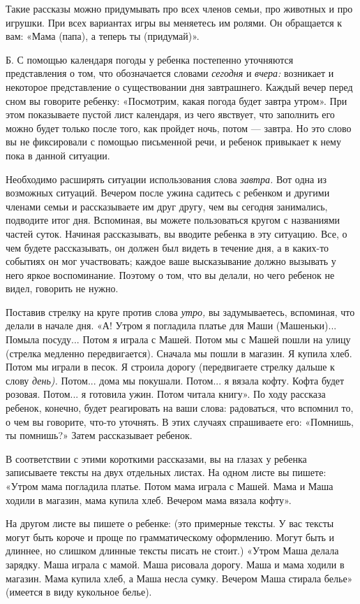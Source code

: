 \documentclass{book}
\renewcommand{\emph}[1]{\textit{#1}}
\begin{document}
Такие рассказы можно придумывать про всех членов семьи, про животных и
про игрушки. При всех вариантах игры вы меняетесь им ролями. Он
обращается к вам: «Мама (папа), а теперь ты (придумай)».

Б. С помощью календаря погоды у ребенка постепенно уточняются
представления о том, что обозначается словами \emph{сегодня} и
\emph{вчера:} возникает и некоторое представление о существовании дня
завтрашнего. Каждый вечер перед сном вы говорите ребенку: «Посмотрим,
какая погода будет завтра утром». При этом показываете пустой лист
календаря, из чего явствует, что заполнить его можно будет только после
того, как пройдет ночь, потом --- завтра. Но это слово вы не фиксировали
с помощью письменной речи, и ребенок привыкает к нему пока в данной
ситуации.

Необходимо расширять ситуации использования слова \emph{завтра.} Вот
одна из возможных ситуаций. Вечером после ужина садитесь с ребенком и
другими членами семьи и рассказываете им друг другу, чем вы сегодня
занимались, подводите итог дня. Вспоминая, вы можете пользоваться кругом
с названиями частей суток. Начиная рассказывать, вы вводите ребенка в
эту ситуацию. Все, о чем будете рассказывать, он должен был видеть в
течение дня, а в каких-то событиях он мог участвовать; каждое ваше
высказывание должно вызывать у него яркое воспоминание. Поэтому о том,
что вы делали, но чего ребенок не видел, говорить не нужно.

Поставив стрелку на круге против слова \emph{утро,} вы задумываетесь,
вспоминая, что делали в начале дня. «А! Утром я погладила платье для
Маши (Машеньки)... Помыла посуду... Потом я играла с Машей. Потом мы с
Машей пошли на улицу (стрелка медленно передвигается). Сначала мы пошли
в магазин. Я купила хлеб. Потом мы играли в песок. Я строила дорогу
(передвигаете стрелку дальше к слову \emph{день).} Потом... дома мы
покушали. Потом... я вязала кофту. Кофта будет розовая. Потом... я
готовила ужин. Потом читала книгу». По ходу рассказа ребенок, конечно,
будет реагировать на ваши слова: радоваться, что вспомнил то, о чем вы
говорите, что-то уточнять. В этих случаях спрашиваете его: «Помнишь, ты
помнишь?» Затем рассказывает ребенок.

В соответствии с этими короткими рассказами, вы на глазах у ребенка
записываете тексты на двух отдельных листах. На одном листе вы пишете:
«Утром мама погладила платье. Потом мама играла с Машей. Мама и Маша
ходили в магазин, мама купила хлеб. Вечером мама вязала кофту».

На другом листе вы пишете о ребенке: (это примерные тексты. У вас тексты
могут быть короче и проще по грамматическому оформлению. Могут быть и
длиннее, но слишком длинные тексты писать не стоит.) «Утром Маша делала
зарядку. Маша играла с мамой. Маша рисовала дорогу. Маша и мама ходили в
магазин. Мама купила хлеб, а Маша несла сумку. Вечером Маша стирала
белье» (имеется в виду кукольное белье).
\end{document}
